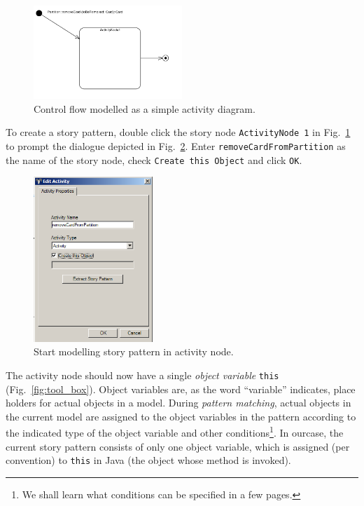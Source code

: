 \begin{figure}[htp]
\begin{center}
  \includegraphics[width=0.5\textwidth]{pics/sdmBilder/removeCard/sdm06RAW}
  \caption{Control flow modelled as a simple activity diagram.}  
  \label{fig:sdm_complete_control_flow_simple}
\end{center}
\end{figure}

To create a story pattern, double click the story node \texttt{ActivityNode 1}
in Fig.~\ref{fig:sdm_complete_control_flow_simple} to prompt the dialogue
depicted in Fig.~\ref{fig:story_pattern}.  Enter
\texttt{remove\-Card\-From\-Partition} as the name of the story node, check
\texttt{Create this Object} and click \texttt{OK}.

\begin{figure}[htp]
\begin{center} 
  \includegraphics[width=0.4\textwidth]{pics/sdmBilder/removeCard/sdm07RAW}
  \caption{Start modelling story pattern in activity node.}  
  \label{fig:story_pattern}
\end{center}
\end{figure}

The activity node should now have a single \emph{object variable} \texttt{this}
(Fig.~\ref{fig:tool_box}). Object variables are, as the word ``variable'' indicates,
place holders for actual objects in a model.  During \emph{pattern matching},
actual objects in the  current model are assigned to the object variables in the
pattern according to  the indicated type of the object variable and other
conditions\footnote{We shall learn what conditions can be specified in a
few pages.}. In our\clearpage case, the current story pattern consists of only
one object variable, which is assigned (per convention) to \texttt{this} in Java (the
object whose method is invoked).

